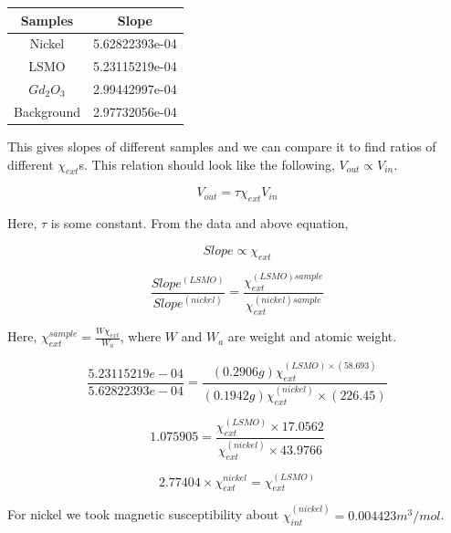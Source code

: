 \noindent\setlength\tabcolsep{4pt}%
\begin{tabularx}{\linewidth}{c|c}
  \hline
  \hline
  Samples & Slope \\
  \hline
Nickel  & 5.62822393e-04 \\
LSMO  & 5.23115219e-04 \\
$Gd_2O_3$  & 2.99442997e-04 \\
Background  & 2.97732056e-04 \\
\hline
\hline
\end{tabularx}
\label{Slopes}
\vskip1cm


This gives slopes of different samples and we can compare it to find ratios of different $\chi_{ext}$s. This relation should look like the following, $V_{out} \propto V_{in}$.
 
\begin{equation*}
V_{out} = \tau \chi_{ext} V_{in} 
\end{equation*}

Here, $\tau$ is some constant. From the data and above equation,  

\begin{equation*}
Slope \propto \chi_{ext}
\end{equation*}

\begin{equation*}
\frac{Slope^{(LSMO)}}{Slope^{(nickel)}} = \frac{\chi_{ext}^{(LSMO) sample}}{\chi_{ext}^{(nickel) sample}}
\end{equation*}

Here, $\chi_{ext}^{sample}= \frac{W \chi_{ext}}{W_a}$, where $W$ and $W_a$ are weight and atomic weight.

\begin{equation*}
\frac{5.23115219e-04}{5.62822393e-04} = \frac{(0.2906 g)\chi_{ext}^{(LSMO) \times (58.693)}}{(0.1942 g)\chi_{ext}^{(nickel)} \times (226.45)}
\end{equation*}

\begin{equation*}
1.075905 = \frac{\chi_{ext}^{(LSMO)}\times 17.0562}{\chi_{ext}^{(nickel)} \times 43.9766}
\end{equation*}

\begin{equation*}
2.77404 \times \chi_{ext}^{nickel} = \chi_{ext}^{(LSMO)}
\end{equation*}

For nickel we took magnetic susceptibility about $\chi_{int}^{(nickel)}=0.004423 m^3/mol$.

